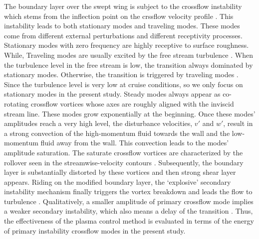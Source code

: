 \documentclass{AIAA}
\begin{document}
The boundary layer over the swept wing is subject to the crossflow instability which stems from the inflection point on the crssflow velocity profile \cite{Saric2003}. This instability leads to both stationary modes and traveling modes. These modes come from different external perturbations and different receptivity processes. Stationary modes with zero frequency are highly receptive to surface roughness. While, Traveling modes are usually excited by the free stream turbulence \cite{Schrader2008}. When the turbulence level in the free stream is low, the transition always dominated by stationary modes. Otherwise, the transition is triggered by traveling modes \cite{Bipps1999}. Since the turbulence level is very low at cruise conditions, so we only focus on stationary modes in the present study. Steady modes always appear as co-rotating crossflow vortices whose axes are roughly aligned with the inviscid stream line. These modes grow exponentially at the beginning. Once these modes' amplitudes reach a very high level, the disturbance velocities, $v'$ and $w'$, result in a strong convection of the high-momentum fluid towards the wall and the low-momentum fluid away from the wall. This convection leads to the modes' amplitude saturation. The saturate crossflow vortices are characterized by the rollover seen in the streamwise-velocity contours \cite{Malik1994,Haynes2000}. Subsequently, the boundary layer is substantially distorted by these vortices and then strong shear layer appears. Riding on the modified boundary layer, the `explosive' secondary instability mechanism finally triggers the vortex breakdown and leads the flow to turbulence \cite{White2005}. %
Qualitatively, a smaller amplitude of primary crossflow mode implies a weaker secondary instability, which also means a delay of the transition \cite{Li2015a}. Thus, the effectiveness of the plasma control method is evaluated in terms of the energy of primary instability crossflow modes in the present study.
\end{document}
